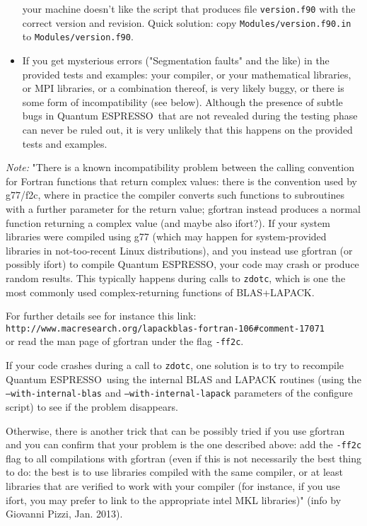 \documentclass[12pt,a4paper]{article}
\def\qe{{\sc Quantum ESPRESSO}}
\begin{document}
\begin{itemize}
your machine doesn't like the script that produces file \texttt{version.f90}
with the correct version and revision. Quick solution: copy 
\texttt{Modules/version.f90.in} to \texttt{Modules/version.f90}.
\item
If you get mysterious errors ("Segmentation faults" and the like) 
in the provided tests and examples:
your compiler, or your mathematical libraries, or MPI libraries,
or a combination thereof, is very likely buggy, or there is some
form of incompatibility (see below). Although the 
presence of subtle bugs in \qe\ that are not revealed during 
the testing phase can never be ruled out, it is very unlikely
that this happens on the provided tests and examples. 
\end{itemize}

{\em Note:} "There is a known incompatibility problem between the calling 
convention for Fortran functions that return complex values: there is the
convention used by 
g77/f2c, where in practice the compiler converts such functions to subroutines 
with a further parameter for the return value; gfortran instead produces a 
normal function returning a complex value (and maybe also ifort?).
If your system libraries were compiled using g77 (which may happen for
system-provided libraries in not-too-recent Linux distributions),
and you instead use gfortran (or possibly ifort) to compile \qe, your code
may crash or produce random results. This typically happens 
during calls to \texttt{zdotc}, which is one the most commonly used
complex-returning functions of BLAS+LAPACK.

For further details see for instance this link:\\
\texttt{http://www.macresearch.org/lapackblas-fortran-106\#comment-17071}\\
or read the man page of gfortran under the flag \texttt{-ff2c}.

If your code crashes during a call to \texttt{zdotc},
one solution is to try to recompile \qe\ using the internal BLAS and LAPACK
routines (using the \texttt{--with-internal-blas} and 
\texttt{--with-internal-lapack} parameters of the configure script)
to see if the problem disappears.

Otherwise, there is another trick that can be possibly tried if you use gfortran
and you can confirm that your problem is the one described above:
add the \texttt{-ff2c} flag to all compilations with 
gfortran (even if this is not necessarily the best thing to do: the best
is to use libraries compiled with the same 
compiler, or at least libraries that are verified to work with your compiler
(for instance, if you use ifort, you may prefer to link to 
the appropriate intel MKL libraries)" (info by Giovanni Pizzi, Jan. 2013).
\end{document}
